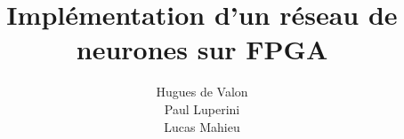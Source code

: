 \documentclass[A4]{article}
\title{Implémentation d'un réseau de neurones sur FPGA}
\author{Hugues de Valon\\ Paul Luperini\\ Lucas Mahieu}
\begin{document}
\maketitle
   
   
\pagebreak
\tableofcontents

\pagebreak

\end{document}
